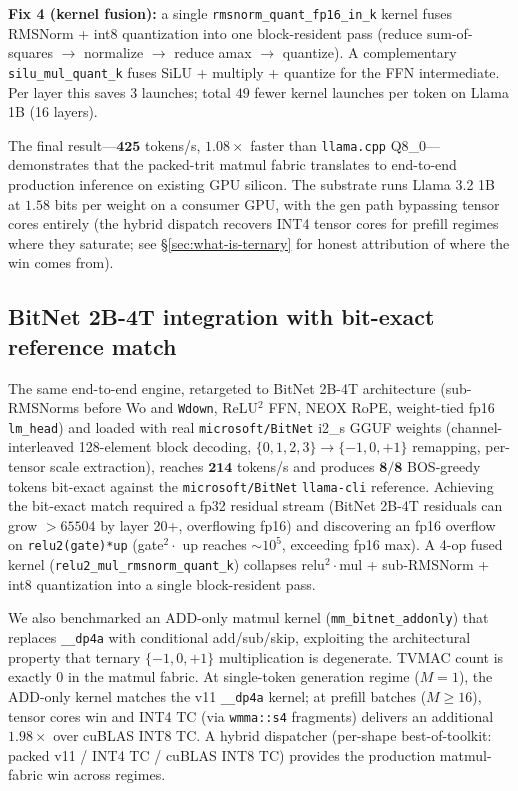 \documentclass{article}
\begin{document}
\textbf{Fix 4 (kernel fusion):} a single \texttt{rmsnorm\_quant\_fp16\_in\_k}
kernel fuses RMSNorm + int8 quantization into one block-resident pass
(reduce sum-of-squares $\rightarrow$ normalize $\rightarrow$ reduce
amax $\rightarrow$ quantize). A complementary
\texttt{silu\_mul\_quant\_k} fuses {SiLU} + multiply + quantize for
the {FFN} intermediate. Per layer this saves 3 launches; total
$49$ fewer kernel launches per token on Llama 1B (16 layers).

The final result---$\mathbf{425}$ tokens/s, $\mathbf{1.08\times}$
faster than \texttt{llama.cpp} {Q8\_0}---demonstrates that the
packed-trit matmul fabric translates to end-to-end production
inference on existing {GPU} silicon. The substrate runs Llama 3.2 1B
at $\mathbf{1.58}$ bits per weight on a consumer {GPU}, with the
gen path bypassing tensor cores entirely (the hybrid dispatch
recovers {INT4} tensor cores for prefill regimes where they
saturate; see \S\ref{sec:what-is-ternary} for honest attribution of
where the win comes from).

\subsection{BitNet 2B-4T integration with bit-exact reference match}
\label{sec:bitnet-e2e}

The same end-to-end engine, retargeted to BitNet 2B-4T architecture
(sub-{RMSNorm}s before {Wo} and \texttt{Wdown}, {ReLU}$^2$ {FFN}, {NEOX}
{RoPE}, weight-tied fp16 \texttt{lm\_head}) and loaded with real
\texttt{microsoft/BitNet} i2\_s {GGUF} weights (channel-interleaved
128-element block decoding, $\{0,1,2,3\} \rightarrow \{-1,0,+1\}$
remapping, per-tensor scale extraction), reaches $\mathbf{214}$
tokens/s and produces $\mathbf{8/8}$ {BOS}-greedy tokens bit-exact
against the \texttt{microsoft/BitNet} \texttt{llama-cli} reference.
Achieving the bit-exact match required a fp32 residual stream
(BitNet 2B-4T residuals can grow $> 65504$ by layer 20+, overflowing
fp16) and discovering an fp16 overflow on
\texttt{relu2(gate)*up} (gate$^2 \cdot$ up reaches $\sim 10^5$,
exceeding fp16 max). A 4-op fused kernel
(\texttt{relu2\_mul\_rmsnorm\_quant\_k}) collapses
relu$^2 \cdot$mul + sub-{RMSNorm} + int8 quantization into a single
block-resident pass.

We also benchmarked an {ADD}-only matmul kernel
(\texttt{mm\_bitnet\_addonly}) that replaces \texttt{\_\_dp4a} with
conditional add/sub/skip, exploiting the architectural property that
ternary $\{-1,0,+1\}$ multiplication is degenerate. {TVMAC}
count is exactly $0$ in the matmul fabric. At single-token
generation regime ($M=1$), the {ADD}-only kernel matches the v11
\texttt{\_\_dp4a} kernel; at prefill batches ($M \geq 16$), tensor
cores win and {INT4} {TC} (via \texttt{wmma::s4} fragments)
delivers an additional $1.98\times$ over cuBLAS {INT8} {TC}. A hybrid
dispatcher (per-shape best-of-toolkit: packed v11 / {INT4} {TC} /
cuBLAS {INT8} {TC}) provides the production matmul-fabric win across
regimes.
\end{document}
